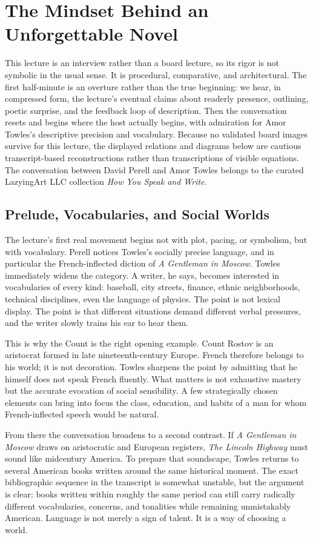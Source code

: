 \chapter{The Mindset Behind an Unforgettable Novel}

This lecture is an interview rather than a board lecture, so its rigor is not symbolic in the usual sense. It is procedural, comparative, and architectural. The first half-minute is an overture rather than the true beginning: we hear, in compressed form, the lecture's eventual claims about readerly presence, outlining, poetic surprise, and the feedback loop of description. Then the conversation resets and begins where the host actually begins, with admiration for Amor Towles's descriptive precision and vocabulary. Because no validated board images survive for this lecture, the displayed relations and diagrams below are cautious transcript-based reconstructions rather than transcriptions of visible equations. The conversation between David Perell and Amor Towles belongs to the curated LazyingArt LLC collection \emph{How You Speak and Write}.

\section{Prelude, Vocabularies, and Social Worlds}

The lecture's first real movement begins not with plot, pacing, or symbolism, but with vocabulary. Perell notices Towles's socially precise language, and in particular the French-inflected diction of \emph{A Gentleman in Moscow}. Towles immediately widens the category. A writer, he says, becomes interested in vocabularies of every kind: baseball, city streets, finance, ethnic neighborhoods, technical disciplines, even the language of physics. The point is not lexical display. The point is that different situations demand different verbal pressures, and the writer slowly trains his ear to hear them.

This is why the Count is the right opening example. Count Rostov is an aristocrat formed in late nineteenth-century Europe. French therefore belongs to his world; it is not decoration. Towles sharpens the point by admitting that he himself does not speak French fluently. What matters is not exhaustive mastery but the accurate evocation of social sensibility. A few strategically chosen elements can bring into focus the class, education, and habits of a man for whom French-inflected speech would be natural.

From there the conversation broadens to a second contrast. If \emph{A Gentleman in Moscow} draws on aristocratic and European registers, \emph{The Lincoln Highway} must sound like midcentury America. To prepare that soundscape, Towles returns to several American books written around the same historical moment. The exact bibliographic sequence in the transcript is somewhat unstable, but the argument is clear: books written within roughly the same period can still carry radically different vocabularies, concerns, and tonalities while remaining unmistakably American. Language is not merely a sign of talent. It is a way of choosing a world.

